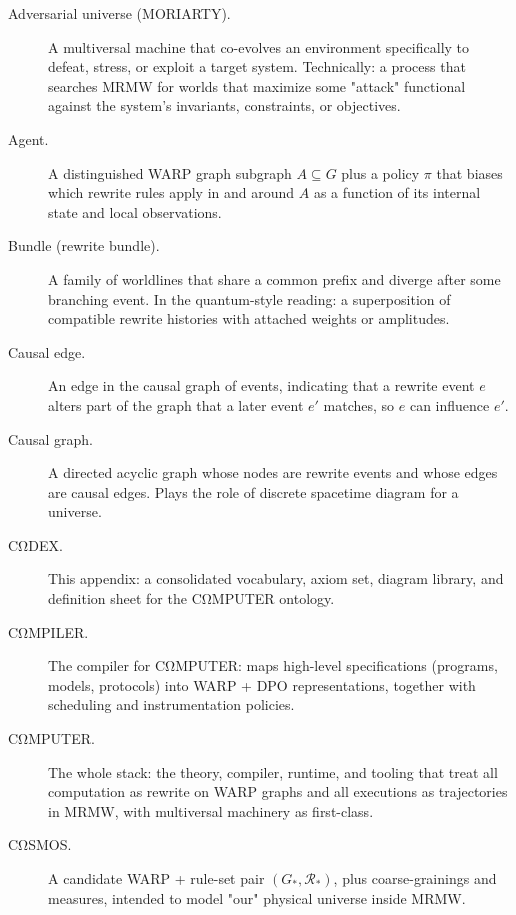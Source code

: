 \begin{description}

  \item[Adversarial universe (MORIARTY).]
    A multiversal machine that co-evolves an environment specifically to
    defeat, stress, or exploit a target system. Technically: a process
    that searches MRMW for worlds that maximize some "attack" functional
    against the system’s invariants, constraints, or objectives.

  \item[Agent.]
    A distinguished WARP graph subgraph $A \subseteq G$ plus a policy $\pi$ that
    biases which rewrite rules apply in and around $A$ as a function of
    its internal state and local observations.

  \item[Bundle (rewrite bundle).]
    A family of worldlines that share a common prefix and diverge after
    some branching event. In the quantum-style reading: a superposition
    of compatible rewrite histories with attached weights or amplitudes.

  \item[Causal edge.]
    An edge in the causal graph of events, indicating that a rewrite event
    $e$ alters part of the graph that a later event $e'$ matches, so $e$
    can influence $e'$.

  \item[Causal graph.]
    A directed acyclic graph whose nodes are rewrite events and whose edges
    are causal edges. Plays the role of discrete spacetime diagram for a
    universe.

  \item[CΩDEX.]
    This appendix: a consolidated vocabulary, axiom set, diagram library,
    and definition sheet for the CΩMPUTER ontology.

  \item[CΩMPILER.]
    The compiler for CΩMPUTER: maps high-level specifications (programs,
    models, protocols) into WARP + DPO representations, together with
    scheduling and instrumentation policies.

  \item[CΩMPUTER.]
    The whole stack: the theory, compiler, runtime, and tooling that treat
    all computation as rewrite on WARP graphs and all executions as trajectories
    in MRMW, with multiversal machinery as first-class.

  \item[CΩSMOS.]
    A candidate WARP + rule-set pair $(G_\ast,\mathcal{R}_\ast)$, plus
    coarse-grainings and measures, intended to model "our" physical
    universe inside MRMW.


\end{description}
